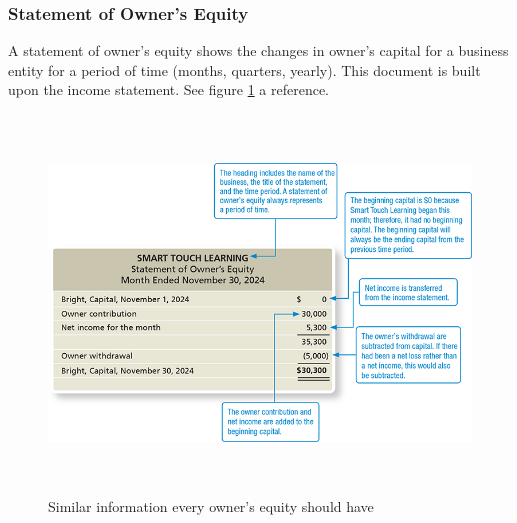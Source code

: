 \documentclass[a4paper, 12pt]{article}
\begin{document}
\subsubsection{Statement of Owner's Equity}
A statement of owner's equity shows the changes in owner's capital for a
business entity for a period of time (months, quarters, yearly). This document
is built upon the income statement. See figure \ref{fig:owner_equity} a
reference.
\begin{figure}[h]
    \centering
    \includegraphics[height=10.0cm, width=13.0cm]{owners_equity.png}
    \caption{Similar information every owner's equity should have}
    \label{fig:owner_equity}
\end{figure}
\end{document}
